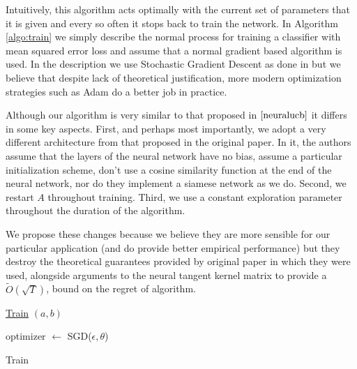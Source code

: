 \documentclass{article}
\begin{document}
Intuitively, this algorithm acts optimally with the current set of parameters that it is given and every so often it stops back to train the network. In Algorithm \ref{algo:train} we simply describe the normal process for training a classifier with mean squared error loss and assume that a normal gradient based algorithm is used.
In the description we use Stochastic Gradient Descent as done in \cite{neuralucb} but we believe that despite lack of theoretical justification, more modern optimization strategies such as Adam \cite{adam} do a better job in practice.

Although our algorithm is very similar to that proposed in $\cite{neuralucb}$ it differs in some key aspects.
First, and perhaps most importantly, we adopt a very different architecture from that proposed in the original paper.
In it, the authors assume that the layers of the neural network have no bias, assume a particular initialization scheme, don't use a cosine similarity function at the end of the neural network, nor do they implement a siamese network as we do.
Second, we restart $A$ throughout training. Third, we use a constant exploration parameter throughout the duration of the algorithm.

We propose these changes because we believe they are more sensible for our particular application (and do provide better empirical performance) but they destroy the theoretical guarantees provided by original paper in which they were used, alongside arguments to the  neural tangent kernel matrix \cite{neuraltangentkernel} to provide a $\tilde{O}(\sqrt{T})$, bound on the regret of algorithm.

  \begin{algorithm}
  \label{algo:train}
    \underline{Train} $(a,b)$\;

    optimizer $\gets$ SGD($\epsilon, \theta$)\;
    \caption{Train}
  \end{algorithm}
\end{document}
